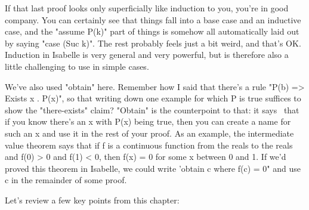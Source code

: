 If that last proof looks only superficially like induction to you, you're in good company. You can certainly see that things fall into a base case and an inductive case, and the "assume P(k)" part of things is somehow all automatically laid out by saying "case (Suc k)". The rest probably feels just a bit weird, and that's OK. Induction in Isabelle is very general and very powerful, but is therefore also a little challenging to use in simple cases.

We've also used "obtain" here. Remember how I said that there's a rule "P(b) => Exists x . P(x)", so that writing down one example for which P is true suffices to show the "there-exists" claim? "Obtain" is the counterpoint to that: it says  that if you know there's an x with P(x) being true, then you can create a name for such an x and use it in the rest of your proof. As an example, the intermediate value theorem says that if f is a continuous function from the reals to the reals and f(0) > 0 and f(1) < 0, then f(x) = 0 for some x between 0 and 1. If we'd proved this theorem in Isabelle, we could write 'obtain c where f(c) = 0" and use c in the remainder of some proof.  

Let's review a few key points from this chapter:

